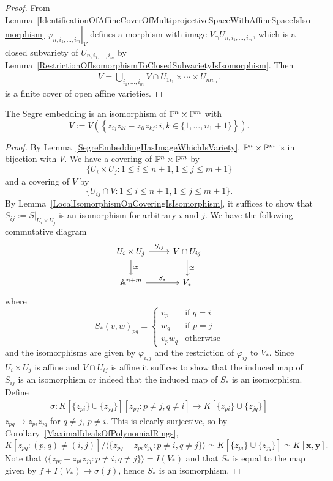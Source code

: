     \begin{proof}
        From Lemma~\ref{IdentificationOfAffineCoverOfMultiprojectiveSpaceWithAffineSpaceIsIsomorphism} $\left.\varphi_{n,i_1,\dots,i_m}\right|_{V}$ defines a morphism with image $V_\cap U_{n,i_1,\dots,i_m}$, which is a closed subvariety of $U_{n,i_1,\dots,i_m}$ by Lemma~\ref{RestrictionOfIsomorphismToClosedSubvarietyIsIsomorphism}. Then
        \begin{align*}
            V= \bigcup_{i_1,\dots,i_m} V\cap U_{1i_1}\times \cdots \times U_{mi_m}.
        \end{align*}
        is a finite cover of open affine varieties. 
    \end{proof}
    \begin{lemma}
        The Segre embedding is an isomorphism of $\mathbb{P}^n\times \mathbb{P}^m$ with 
        $$V:=V(\left\{z_{ij}z_{kl} - z_{il}z_{kj} : i,k\in\{1,\dots, n_1+1\}\right\}).$$ 
    \end{lemma}
    \begin{proof}
        By Lemma~\ref{SegreEmbeddingHasImageWhichIsVariety}. $\mathbb{P}^n\times \mathbb{P}^m$ is in bijection with $V$. We have a covering of $\mathbb{P}^n\times \mathbb{P}^m$ by $$\{ U_i\times U_j : 1\leq i\leq n+1, 1\leq j\leq m+1\}$$ 
        and a covering of $V$ by 
        $$\{U_{ij}\cap V : 1\leq i\leq n+1 , 1\leq j\leq m+1\}.$$
        By Lemma~\ref{LocalIsomorphismOnCoveringIsIsomorphism}, it suffices to show that $S_{ij}:=\left.S\right|_{U_i\times U_j}$ is an isomorphism for arbitrary $i$ and $j$. We have the following commutative diagram
        $$\begin{tikzcd}
            U_i\times U_j \arrow[r,"S_{ij}"] \arrow[d, "\simeq"] & V\cap U_{ij} \arrow[d, "\simeq"]\\
            \A^{n+m} \arrow[r, "S_\ast"] & V_\ast
        \end{tikzcd} $$
        where
        $$S_\ast(v,w)_{pq} = \begin{cases}
            v_{p} & \text{if } q=i\\
            w_q & \text{if } p=j\\
            v_pw_q & \text{otherwise}
        \end{cases}$$
        and the isomorphisms are given by $\varphi_{i,j}$ and the restriction of $\varphi_{ij}$ to $V_\ast$. Since $U_i\times U_j$ is affine and $V\cap U_{ij}$ is affine it suffices to show that the induced map of $S_{ij}$ is an isomorphism or indeed that the induced map of $S_\ast$ is an isomorphism.
        Define 
        \begin{gather*}
            \sigma: K[\{z_{pi}\}\cup\{z_{jq}\}][z_{pq} : p\neq j, q\neq i]\rightarrow K[\{z_{pi}\}\cup \{z_{jq}\}]
        \end{gather*}
        $z_{pq}\mapsto z_{pi}z_{jq}$ for $q\neq j$, $p\neq i$. This is clearly surjective, so by Corollary~\ref{MaximalIdealsOfPolynomialRings}, 
        $$K[z_{pq}: (p,q)\neq (i,j)]/\langle \{z_{pq}-z_{pi}z_{jq} : p\neq i,q\neq j\}\rangle\simeq K[\{z_{pi}\}\cup \{z_{jq}\}]\simeq K[\mathbf{x},\mathbf{y}].$$
        Note that $\langle \{z_{pq}-z_{pi}z_{jq} : p\neq i,q\neq j\}\rangle = I(V_\ast)$ and that $\widetilde{S_\ast}$ is equal to the map given by $f+I(V_\ast)\mapsto \sigma(f)$, hence $S_\ast$ is an isomorphism.
    \end{proof}
